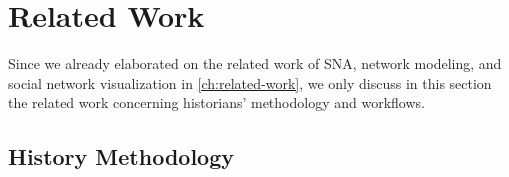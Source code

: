 


\section{Related Work}

Since we already elaborated on the related work of SNA, network modeling, and social network visualization in \autoref{ch:related-work}, we only discuss in this section the related work concerning historians' methodology and workflows.


\subsection{History Methodology}

